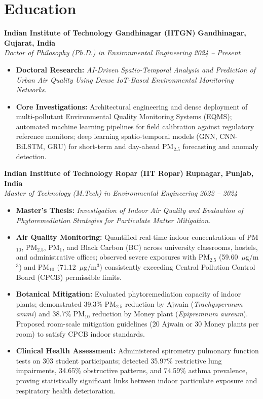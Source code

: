 \documentclass[10pt,a4paper]{article}
\newcommand{\entryheader}[4]{
    \noindent\textbf{#1} \hfill \textbf{\color{subtext}#2} \\
    \textit{#3} \hfill \textit{\color{subtext}#4}
    \vspace{1.5pt}
}
\begin{document}
\section{Education}

\entryheader{Indian Institute of Technology Gandhinagar (IITGN)}{Gandhinagar, Gujarat, India}{Doctor of Philosophy (Ph.D.) in Environmental Engineering}{2024 -- Present}
\begin{itemize}
    \item \textbf{Doctoral Research:} \textit{AI-Driven Spatio-Temporal Analysis and Prediction of Urban Air Quality Using Dense IoT-Based Environmental Monitoring Networks}.
    \item \textbf{Core Investigations:} Architectural engineering and dense deployment of multi-pollutant Environmental Quality Monitoring Systems (EQMS); automated machine learning pipelines for field calibration against regulatory reference monitors; deep learning spatio-temporal models (GNN, CNN-BiLSTM, GRU) for short-term and day-ahead PM$_{2.5}$ forecasting and anomaly detection.
\end{itemize}
\vspace{3pt}

\entryheader{Indian Institute of Technology Ropar (IIT Ropar)}{Rupnagar, Punjab, India}{Master of Technology (M.Tech) in Environmental Engineering}{2022 -- 2024}
\begin{itemize}
    \item \textbf{Master's Thesis:} \textit{Investigation of Indoor Air Quality and Evaluation of Phytoremediation Strategies for Particulate Matter Mitigation}.
    \item \textbf{Air Quality Monitoring:} Quantified real-time indoor concentrations of PM$_{10}$, PM$_{2.5}$, PM$_{1}$, and Black Carbon (BC) across university classrooms, hostels, and administrative offices; observed severe exposures with PM$_{2.5}$ (59.60~$\mu$g/m$^3$) and PM$_{10}$ (71.12~$\mu$g/m$^3$) consistently exceeding Central Pollution Control Board (CPCB) permissible limits.
    \item \textbf{Botanical Mitigation:} Evaluated phytoremediation capacity of indoor plants; demonstrated 39.3\% PM$_{2.5}$ reduction by Ajwain (\textit{Trachyspermum ammi}) and 38.7\% PM$_{10}$ reduction by Money plant (\textit{Epipremnum aureum}). Proposed room-scale mitigation guidelines (20 Ajwain or 30 Money plants per room) to satisfy CPCB indoor standards.
    \item \textbf{Clinical Health Assessment:} Administered spirometry pulmonary function tests on 303 student participants; detected 35.97\% restrictive lung impairments, 34.65\% obstructive patterns, and 74.59\% asthma prevalence, proving statistically significant links between indoor particulate exposure and respiratory health deterioration.
\end{itemize}
\vspace{3pt}
\end{document}

